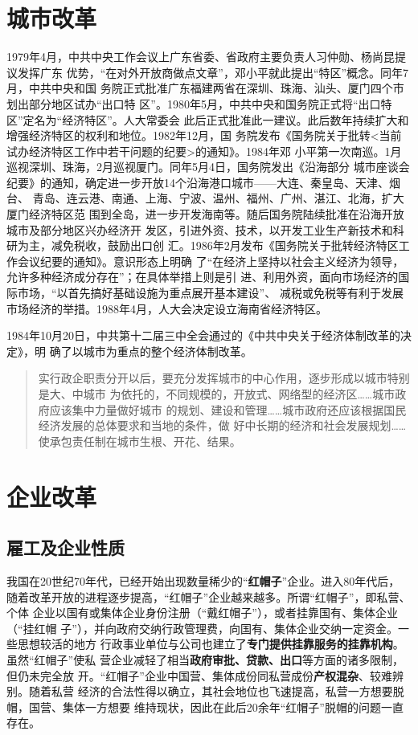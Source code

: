 \section{城市改革}

1979年4月，中共中央工作会议上广东省委、省政府主要负责人习仲勋、杨尚昆提议发挥广东
优势，“在对外开放商做点文章”，邓小平就此提出“特区”概念。同年7月，中共中央和国
务院正式批准广东福建两省在深圳、珠海、汕头、厦门四个市划出部分地区试办“出口特
区”。1980年5月，中共中央和国务院正式将“出口特区”定名为“经济特区”。人大常委会
此后正式批准此一建议。此后数年持续扩大和增强经济特区的权利和地位。1982年12月，国
务院发布《国务院关于批转<当前试办经济特区工作中若干问题的纪要>的通知》。1984年邓
小平第一次南巡。1月巡视深圳、珠海，2月巡视厦门。同年5月4日，国务院发出《沿海部分
城市座谈会纪要》的通知，确定进一步开放14个沿海港口城市——大连、秦皇岛、天津、烟台、
青岛、连云港、南通、上海、宁波、温州、福州、广州、湛江、北海，扩大厦门经济特区范
围到全岛，进一步开发海南等。随后国务院陆续批准在沿海开放城市及部分地区兴办经济开
发区，引进外资、技术，以开发工业生产新技术和科研为主，减免税收，鼓励出口创
汇。1986年2月发布《国务院关于批转经济特区工作会议纪要的通知》。意识形态上明确
了“在经济上坚持以社会主义经济为领导，允许多种经济成分存在”；在具体举措上则是引
进、利用外资，面向市场经济的国际市场，“以首先搞好基础设施为重点展开基本建设”、
减税或免税等有利于发展市场经济的举措。1988年4月，人大会决定设立海南省经济特区。

1984年10月20日，中共第十二届三中全会通过的《中共中央关于经济体制改革的决定》，明
确了以城市为重点的整个经济体制改革。
\begin{quotation}
  实行政企职责分开以后，要充分发挥城市的中心作用，逐步形成以城市特别是大、中城市
  为依托的，不同规模的，开放式、网络型的经济区……城市政府应该集中力量做好城市
  的规划、建设和管理……城市政府还应该根据国民经济发展的总体要求和当地的条件，做
  好中长期的经济和社会发展规划……使承包责任制在城市生根、开花、结果。
\end{quotation}

\section{企业改革}

\subsection{雇工及企业性质}

我国在20世纪70年代，已经开始出现数量稀少的“\textbf{红帽子}”企业。进入80年代后，
随着改革开放的进程逐步提高，“红帽子”企业越来越多。所谓“红帽子”，即私营、个体
企业以国有或集体企业身份注册（“戴红帽子”），或者挂靠国有、集体企业（“挂红帽
子”），并向政府交纳行政管理费，向国有、集体企业交纳一定资金。一些思想较活的地方
行政事业单位与公司也建立了\textbf{专门提供挂靠服务的挂靠机构}。虽然“红帽子”使私
营企业减轻了相当\textbf{政府审批、贷款、出口}等方面的诸多限制，但仍未完全放
开。“红帽子”企业中国营、集体成份同私营成份\textbf{产权混杂}、较难辨别。随着私营
经济的合法性得以确立，其社会地位也飞速提高，私营一方想要脱帽，国营、集体一方想要
维持现状，因此在此后20余年“红帽子”脱帽的问题一直存在。

